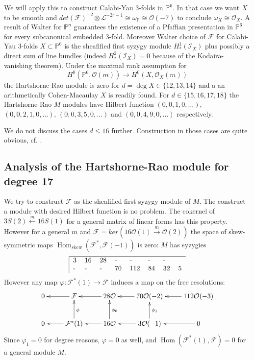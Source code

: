 \documentclass[12pt,leqno]{amsart}
\newcommand{\PP}{{\mathbb P}}
\newcommand{\kf}{{\mathcal F}}
\newcommand{\ki}{{\mathcal I}}
\newcommand{\kl}{{\mathcal L}}
\newcommand{\ko}{{\mathcal O}}
\newcommand{\tensor}{\otimes}
\newlength{\ho}
\DeclareMathOperator{\Hom}{Hom}
\begin{document}
We will apply this to construct Calabi-Yau 3-folds in $\PP^6$. 
In that case we want $X$ to be smooth and 
$det(\kf)^{-2}\tensor\kl^{-2r-1} \cong \omega_\PP\cong \ko(-7)$
to conclude $\omega_X \cong \ko_X$. 
A result of Walter for $\PP^n$ guarantees the existence 
of a Pfaffian presentation in $\PP^6$ for every subcanonical embedded 3-fold. 
Moreover Walter choice of $\kf$ for Calabi-Yau 3-folds $X \subset \PP^6$
is the sheafified first syzygy module $H^1_*(\ki_X)$ plus possibly 
a direct sum of line bundles 
(indeed $H^2_*(\ki_X)=0$ because of the Kodaira-vanishing theorem). 
Under the maximal rank assumption for
$$H^0(\PP^6,\ko(m)) \to H^0(X,\ko_X(m))$$
the Hartshorne-Rao module is zero for $d=\deg X \in \{12,13,14\}$ and a 
an arithmetically Cohen-Macaulay $X$ is readily found. For $d \in 
\{15,16,17,18\}$
the Hartshorne-Rao $M$ modules have Hilbert function
$(0,0,1,0,\ldots)$, $(0,0,2,1,0,\ldots)$, $(0,0,3,5,0,\ldots)$ and 
$(0,0,4,9,0,\ldots)$ respectively.

We do not discuss the cases $d\le 16$ further. 
Construction in those cases are quite obvious, cf. \cite{To}.




\subsection{Analysis of the Hartshorne-Rao module for degree 17}

We try to construct $\kf$ as the sheafified first syzygy module of $M$. 
The construct a module with desired Hilbert function is no problem.
The cokernel of $3S(2) \stackrel{m}{\longleftarrow} 16S(1)$ for a general 
matrix of linear forms has this property. However for a general $m$ and
$\kf = ker( 16\ko(1) \stackrel{m}{\longrightarrow} \ko(2))$ the space of 
skew-symmetric maps $\Hom_{skew}(\kf^*,\kf(-1))$ is zero:  $M$ has syzygies
$$
\begin{tabular}{|llllllll}
\hline
3 & 16 & 28 & - & - & - & - \cr
- & - & - & 70 & 112 & 84 & 32 & 5 \cr
\end{tabular}
$$
\noindent
However any map $\varphi \colon \kf^*(1) \to \kf$ induces a map on the free
resolutions:
$$
\xymatrix{
0 &\kf \ar[l] &28\ko \ar[l] &70\ko(-2) \ar[l] &112\ko(-3) \ar[l] \\
0 &\kf^*(1) \ar[l] \ar[u]_\phi &16\ko \ar[l] \ar[u]_{\phi_0}
&3\ko(-1) \ar[l] \ar[u]_{\phi_1} &0 \ar[l]
}
$$
\noindent
Since $\varphi_1=0$ for degree reasons, $\varphi=0$ as well, and
$\Hom(\kf^*(1),\kf)=0$ for a general module $M$.
\end{document}
